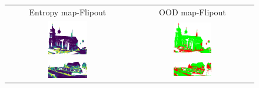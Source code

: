     \begin{figure}[h!]
        \centering
        \begin{tabular}{cc}
            Entropy map-Flipout & OOD map-Flipout \\
            \includegraphics[width=0.33\textwidth, height=0.18\textheight]{images/ood_imgs/fout_sem3d/fout_ent_1.pdf}& 
            \includegraphics[width=0.33\textwidth, height=0.18\textheight]{images/ood_imgs/fout_sem3d/fout_ent_ood_auroc_1.pdf}\\

            \includegraphics[width=0.33\textwidth, height=0.18\textheight]{images/ood_imgs/fout_sem3d/fout_ent_2.pdf}& 
            \includegraphics[width=0.33\textwidth, height=0.18\textheight]{images/ood_imgs/fout_sem3d/fout_ent_ood_auroc_2.pdf}\\


\end{tabular}
\end{figure}
